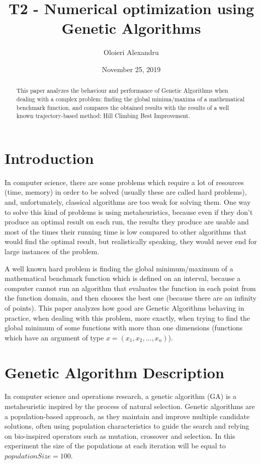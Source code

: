 \documentclass[a4paper]{article}
\title{T2 - Numerical optimization using Genetic Algorithms}
\author{Oloieri Alexandru}
\date{November 25, 2019}
\begin{document}
	
	\maketitle
	
	\begin{abstract}
		\centering
		This paper analyzes the behaviour and performance of Genetic Algorithms when dealing with a complex problem: finding the global minima/maxima of a mathematical benchmark function, and compares the obtained results with the results of a well known trajectory-based method: Hill Climbing Best Improvement.
	\end{abstract}
	
	\section{Introduction}
	
	In computer science, there are some problems which require a lot of resources (time, memory) in order to be solved (usually these are called hard problems), and, unfortunately, classical algorithms are too weak for solving them. One way to solve this kind of problems is using metaheuristics, because even if they don't produce an optimal result on each run, the results they produce are usable and most of the times their running time is low compared to other algorithms that would find the optimal result, but realistically speaking, they would never end for large instances of the problem.
	
	A well known hard problem is finding the global minimum/maximum of a mathematical benchmark function which is defined on an interval, because a computer cannot run an algorithm that evaluates the function in each point from the function domain, and then chooses the best one (because there are an infinity of points). This paper analyzes how good are Genetic Algorithms behaving in practice, when dealing with this problem, more exactly, when trying to find the global minimum of some functions with more than one dimensions (functions which have an argument of type $x = (x_1,x_2,...,x_n)$). 
	
	\section{Genetic Algorithm Description}
	
	In computer science and operations research, a genetic algorithm (GA) is a metaheuristic inspired by the process of natural selection. \cite{GA}
	Genetic algorithms are a population-based approach, as they maintain and improve multiple candidate solutions, often using population characteristics to guide the search and relying on bio-inspired operators such as mutation, crossover and selection. \cite{GA} \cite{Metaheuristics} 
	In this experiment the size of the populations at each iteration will be equal to $populationSize = 100$. 
	
\end{document}
